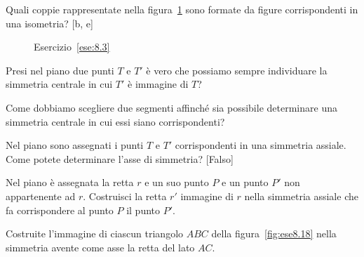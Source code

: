 \begin{esercizio}
\label{ese:8.3}
Quali coppie rappresentate nella figura~\ref{fig:ese8.3} sono formate 
da figure corrispondenti in una isometria? \hfill [b, e]
\end{esercizio}


\begin{inaccessibleblock}
 \begin{figure}[!htb]
  \centering
  \caption{Esercizio~\ref{ese:8.3}}\label{fig:ese8.3}
\end{figure}
\end{inaccessibleblock}

\begin{esercizio}
\label{ese:8.4}
Presi nel piano due punti \(T\) e \(T'\) è vero che possiamo sempre 
individuare la simmetria centrale in cui \(T'\) è immagine di \(T\)?
\end{esercizio}

\begin{esercizio}
\label{ese:8.5}
Come dobbiamo scegliere due segmenti affinché sia possibile 
determinare una simmetria centrale in cui essi siano corrispondenti?
\end{esercizio}

\begin{esercizio}
\label{ese:8.16}
Nel piano sono assegnati i punti \(T\) e \(T'\) corrispondenti in una 
simmetria assiale. Come potete determinare l'asse di simmetria?
\hfill[Falso]
\end{esercizio}

\noindent\begin{minipage}{0.6\textwidth}\parindent15pt
\begin{esercizio}
\label{ese:8.17}
Nel piano è assegnata la retta \(r\) e un suo punto \(P\) e un punto \(P'\) 
non appartenente ad \(r\). Costruisci la retta \(r'\) immagine di \(r\) 
nella simmetria assiale che fa corrispondere al punto \(P\) il punto 
\(P'\).
\end{esercizio}
\end{minipage}\hfil
\begin{minipage}{0.4\textwidth}
  \centering
\end{minipage}\vspace{5pt}

\begin{esercizio}
\label{ese:8.18}
Costruite l'immagine di ciascun triangolo \(ABC\) della 
figura~\ref{fig:ese8.18} nella simmetria avente come asse la retta 
del lato \(AC\).
\end{esercizio}


